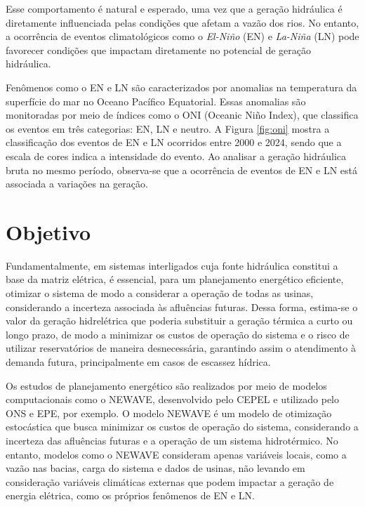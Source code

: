 \begin{figure}[!ht]
	{}
	{}
\end{figure}

Esse comportamento é natural e esperado, uma vez que a geração hidráulica é diretamente influenciada pelas condições
que afetam a vazão dos rios. No entanto, a ocorrência de eventos climatológicos como o \textit{El-Niño} (EN) e 
\textit{La-Niña} (LN) pode favorecer condições que impactam diretamente no potencial de geração hidráulica. \cite{de2012influencia}

Fenômenos como o EN e LN são caracterizados por anomalias na temperatura da superfície do mar no Oceano Pacífico
Equatorial. Essas anomalias são monitoradas por meio de índices como o ONI (Oceanic Niño Index), que classifica os 
eventos em três categorias: EN, LN e neutro. A Figura \ref{fig:oni} mostra a classificação dos eventos de EN e LN 
ocorridos entre 2000 e 2024, sendo que a escala de cores indica a intensidade do evento. Ao analisar a geração 
hidráulica bruta no mesmo período, observa-se que a ocorrência de eventos de EN e LN está associada a variações na geração.

\begin{figure}[!ht]
	{}
	{}
\end{figure}

\section{Objetivo}
Fundamentalmente, em sistemas interligados cuja fonte hidráulica constitui a base da matriz elétrica, é essencial, 
para um planejamento energético eficiente, otimizar o sistema de modo a considerar a operação de todas as usinas, 
considerando a incerteza associada às afluências futuras. Dessa forma, estima-se o valor da geração hidrelétrica que 
poderia substituir a geração térmica a curto ou longo prazo, de modo a minimizar os custos de operação do sistema e o 
risco de utilizar reservatórios de maneira desnecessária, garantindo assim o atendimento à demanda futura, 
principalmente em casos de escassez hídrica.

Os estudos de planejamento energético são realizados por meio de modelos computacionais como o NEWAVE, desenvolvido pelo
CEPEL e utilizado pelo ONS e EPE, por exemplo. O modelo NEWAVE é um modelo de otimização estocástica que busca minimizar
os custos de operação do sistema, considerando a incerteza das afluências futuras e a operação de um sistema hidrotérmico. 
No entanto, modelos como o NEWAVE consideram apenas variáveis locais, como a vazão nas bacias, carga do sistema e dados 
de usinas, não levando em consideração variáveis climáticas externas que podem impactar a geração de energia elétrica, como os 
próprios fenômenos de EN e LN.


